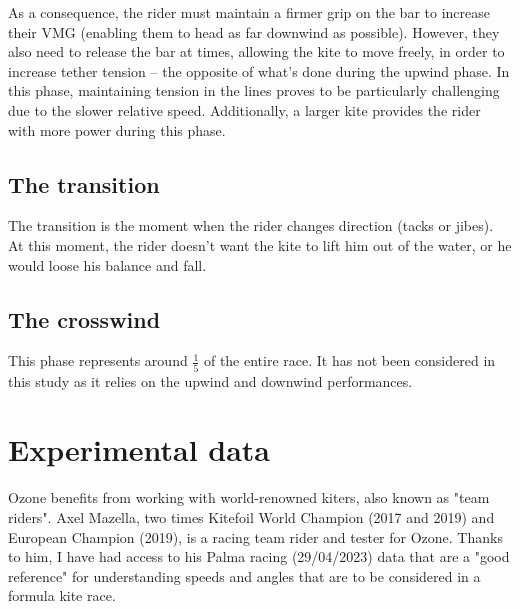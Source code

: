 As a consequence, the rider must maintain a firmer grip on the bar to increase their VMG (enabling them to head as far downwind as possible). However, they also need to release the bar at times, allowing the kite to move freely, in order to increase tether tension – the opposite of what's done during the upwind phase. In this phase, maintaining tension in the lines proves to be particularly challenging due to the slower relative speed. Additionally, a larger kite provides the rider with more power during this phase.


\subsection{The transition}
\label{sub:Ch1.3.1}

The transition is the moment when the rider changes direction (tacks or jibes). At this moment, the rider doesn't want the kite to lift him out of the water, or he would loose his balance and fall. 


\subsection{The crosswind}
\label{sub:Ch1.3.1}

This phase represents around $\frac{1}{5}$ of the entire race. It has not been considered in this study as it relies on the upwind and downwind performances. 


\section{Experimental data }
\label{sec:Ch1.2}

Ozone benefits from working with world-renowned kiters, also known as "team riders". Axel Mazella, two times Kitefoil World Champion (2017 and 2019) and European Champion (2019), is a racing team rider and tester for Ozone. Thanks to him, I have had access to his Palma racing (29/04/2023) data that are a "good reference" for understanding speeds and angles that are to be considered in a formula kite race.  

